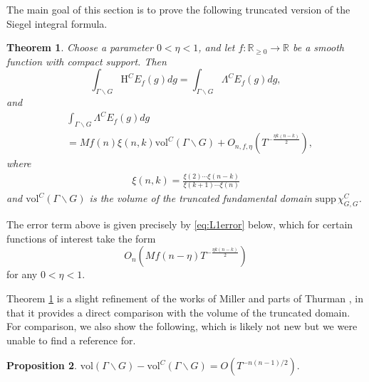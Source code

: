 \documentclass[11pt]{amsart}
\def\R{\mathbb{R}}
\newtheorem{theorem}{Theorem}
\newtheorem{proposition}[theorem]{Proposition}
\numberwithin{theorem}{section}
\numberwithin{equation}{section}
\theoremstyle{remark}
\theoremstyle{definition}
\newcommand{\vol}{\mathrm{vol}}
\newcommand{\G}{\Gamma}
\begin{document}
The main goal of this section is to prove the following truncated version of the Siegel integral formula.
\begin{theorem} \label{thm:L1-norm}
Choose a parameter $0 < \eta < 1$, and let $f:\R_{\geq 0} \rightarrow \R$ be a smooth function with compact support. Then
\begin{equation*}
\int_{\Gamma\backslash G} \mathrm H^C E_f(g)dg = \int_{\Gamma\backslash G} \Lambda^C E_f(g)dg,
\end{equation*}
and
\begin{align*}
&\int_{\Gamma\backslash G} \Lambda^C E_f(g)dg  \\
&= Mf(n)\xi(n,k)\vol^C(\Gamma\backslash G) + O_{n,f,\eta}\left(T^{-\frac{\eta k(n-k)}{2}}\right),
\end{align*}
where 
\begin{align*}
\xi(n,k)=\frac{\xi(2)\cdots\xi(n-k)}{\xi(k+1)\cdots\xi(n)}
\end{align*}
and $\vol^C(\Gamma\backslash G)$ is the volume of the truncated fundamental domain $\mathrm{supp}\,\chi^C_{G,G}$.
\end{theorem}

The error term above is given precisely by \eqref{eq:L1error} below, which for certain functions of interest take the form
\begin{equation*}
O_n\left(Mf(n-\eta)T^{-\frac{\eta k(n-k)}{2}}\right)
\end{equation*}
for any $0 < \eta < 1$.

Theorem \ref{thm:L1-norm} is a slight refinement of the works of Miller \cite{Mil20} and parts of Thurman \cite{Thu24}, in that it provides a direct comparison with the volume of the truncated domain. For comparison, we also show the following, which is likely not new but we were unable to find a reference for.
\begin{proposition} \label{prop:tr_fund_vol}
$\vol(\G\backslash G) - \vol^C(\G\backslash G) = O(T^{-n(n-1)/2}).$
\end{proposition}

\end{document}
